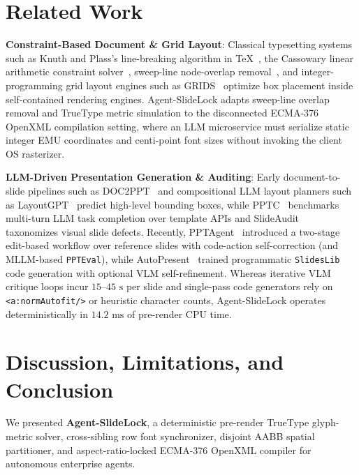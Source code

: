 \documentclass[10pt,journal,compsoc]{IEEEtran}
\begin{document}
\section{Related Work}
\label{sec:related}
\textbf{Constraint-Based Document \& Grid Layout}: Classical typesetting systems such as Knuth and Plass's line-breaking algorithm in \TeX~\cite{knuth1984tex}, the Cassowary linear arithmetic constraint solver~\cite{badros2001cassowary}, sweep-line node-overlap removal~\cite{dwyer2005overlap}, and integer-programming grid layout engines such as GRIDS~\cite{dayama2020grids} optimize box placement inside self-contained rendering engines. Agent-SlideLock adapts sweep-line overlap removal and TrueType metric simulation to the disconnected ECMA-376 OpenXML compilation setting, where an LLM microservice must serialize static integer EMU coordinates and centi-point font sizes without invoking the client OS rasterizer.

\textbf{LLM-Driven Presentation Generation \& Auditing}: Early document-to-slide pipelines such as DOC2PPT~\cite{fu2022doc2ppt} and compositional LLM layout planners such as LayoutGPT~\cite{zhang2023layout} predict high-level bounding boxes, while PPTC~\cite{guo2024pptc} benchmarks multi-turn LLM task completion over template APIs and SlideAudit~\cite{zhang2025slideaudit} taxonomizes visual slide defects. Recently, PPTAgent~\cite{zheng2025pptagent} introduced a two-stage edit-based workflow over reference slides with code-action self-correction (and MLLM-based \texttt{PPTEval}), while AutoPresent~\cite{ge2025autopresent} trained programmatic \texttt{SlidesLib} code generation with optional VLM self-refinement. Whereas iterative VLM critique loops incur $15\text{--}45\text{ s}$ per slide and single-pass code generators rely on \texttt{<a:normAutofit/>} or heuristic character counts, Agent-SlideLock operates deterministically in $14.2\text{ ms}$ of pre-render CPU time.

\section{Discussion, Limitations, and Conclusion}
We presented \textbf{Agent-SlideLock}, a deterministic pre-render TrueType glyph-metric solver, cross-sibling row font synchronizer, disjoint AABB spatial partitioner, and aspect-ratio-locked ECMA-376 OpenXML compiler for autonomous enterprise agents.
\end{document}
